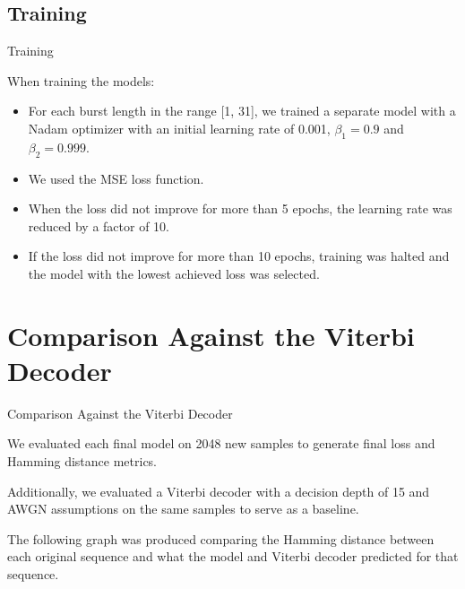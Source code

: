 \documentclass{beamer}
\newcommand{\<}				{\langle}
\renewcommand{\>}      		{\rangle}
\begin{document}
\subsection{Training} 

\begin{frame}{Training} 

When training the models:

\begin{itemize}
\item For each burst length in the range [1, 31], we trained a separate model with a Nadam optimizer with an initial learning rate of 0.001, $\beta_1=0.9$ and $\beta_2=0.999$.

\item We used the MSE loss function.

\item When the loss did not improve for more than 5 epochs, the learning rate was reduced by a factor of 10.

\item If the loss did not improve for more than 10 epochs, training was halted and the model with the lowest achieved loss was selected. 

\end{itemize}

\end{frame}

\section{Comparison Against the Viterbi Decoder} %

\begin{frame}{Comparison Against the Viterbi Decoder}

We evaluated each final model on 2048 new samples to generate final loss and Hamming distance metrics. 

\medskip

Additionally, we evaluated a Viterbi decoder with a decision depth of 15 and AWGN assumptions on the same samples to serve as a baseline.

\medskip

The following graph was produced comparing the Hamming distance between each original sequence and what the model and Viterbi decoder predicted for that sequence.
\end{frame}
\end{document}
